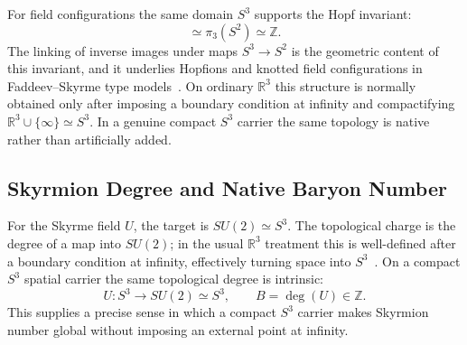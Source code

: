 \documentclass[aps,prd,onecolumn,superscriptaddress,longbibliography,nofootinbib,notitlepage]{revtex4-2}
\renewcommand{\arraystretch}{1.17}
\begin{document}
For field configurations the same domain $S^3$ supports the Hopf invariant:
\begin{equation}
  [S^3,S^2]\simeq\pi_3(S^2)\simeq\mathbb Z .
\end{equation}
The linking of inverse images under maps $S^3\to S^2$ is the geometric content of
this invariant, and it underlies Hopfions and knotted field configurations in
Faddeev--Skyrme type models~\cite{Urbantke2003,Sutcliffe2007}. On ordinary
$\mathbb R^3$ this structure is normally obtained only after imposing a boundary
condition at infinity and compactifying $\mathbb R^3\cup\{\infty\}\simeq S^3$.
In a genuine compact $S^3$ carrier the same topology is native rather than
artificially added.

\subsection{Skyrmion Degree and Native Baryon Number}

For the Skyrme field $U$, the target is $SU(2)\simeq S^3$. The topological
charge is the degree of a map into $SU(2)$; in the usual $\mathbb R^3$ treatment
this is well-defined after a boundary condition at infinity, effectively turning
space into $S^3$~\cite{Manton1998}. On a compact $S^3$ spatial carrier the same
topological degree is intrinsic:
\begin{equation}
  U:S^3\to SU(2)\simeq S^3,
  \qquad
  B=\deg(U)\in\mathbb Z .
\end{equation}
This supplies a precise sense in which a compact $S^3$ carrier makes Skyrmion
number global without imposing an external point at infinity.

\begin{center}
\small
\renewcommand{\arraystretch}{1.18}
\end{center}
\end{document}
